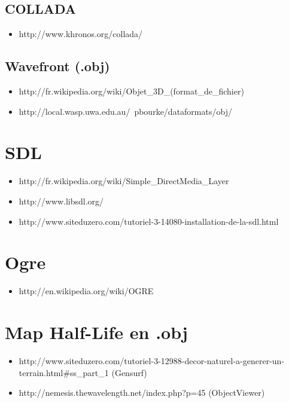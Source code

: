 \documentclass[a4paper,12pt]{report}
\begin{document}
\subsection*{COLLADA}
\begin{itemize}
 \item http://www.khronos.org/collada/
\end{itemize}

\subsection*{Wavefront (.obj)}
\begin{itemize}
 \item http://fr.wikipedia.org/wiki/Objet\_3D\_(format\_de\_fichier)
 
 \item http://local.wasp.uwa.edu.au/~pbourke/dataformats/obj/
\end{itemize}


\section*{SDL}
\begin{itemize}
 \item http://fr.wikipedia.org/wiki/Simple\_DirectMedia\_Layer

 \item http://www.libsdl.org/

 \item http://www.siteduzero.com/tutoriel-3-14080-installation-de-la-sdl.html
\end{itemize}


\section*{Ogre}
\begin{itemize}
 \item http://en.wikipedia.org/wiki/OGRE
\end{itemize}
   

\section*{Map Half-Life en .obj}
\begin{itemize}
 \item http://www.siteduzero.com/tutoriel-3-12988-decor-naturel-a-generer-un-terrain.html\#ss\_part\_1  (Gensurf)
 
 \item http://nemesis.thewavelength.net/index.php?p=45  (ObjectViewer)
\end{itemize}
\end{document}
